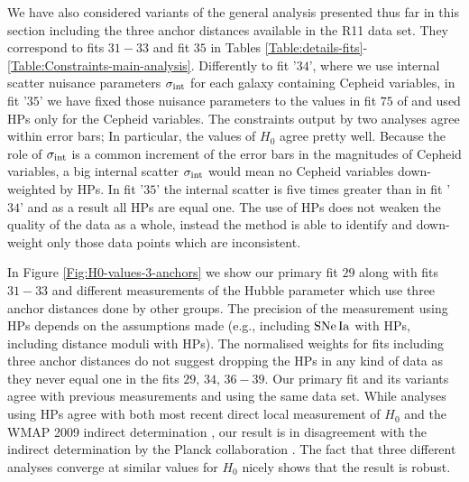 We have also considered variants of the general analysis presented thus far in this section including the three anchor distances available in the R11 data set. They correspond to fits $31-33$ and fit $35$ in Tables \ref{Table:details-fits}-\ref{Table:Constraints-main-analysis}. Differently to fit '$34$', where we use internal scatter nuisance parameters $\sigma_{\mathrm{int}}$ for each galaxy containing Cepheid variables, in fit '$35$'  we have fixed those nuisance parameters to the values in fit $75$ of \cite{Efstathiou:2013via} and used HPs only for the Cepheid variables. The constraints output by two analyses agree within error bars; In particular, the values of $H_0$ agree pretty well. Because the role of $\sigma_{\mathrm{int}}$ is a common increment of the error bars in the magnitudes of Cepheid variables, a big internal scatter $\sigma_{\mathrm{int}}$ would mean no Cepheid variables down-weighted by HPs. In fit '$35$' the internal scatter is five times greater than in fit '$34$' and as a result all HPs are equal one. The use of HPs does not weaken the quality of the data as a whole, instead the method is able to identify and down-weight only those data points which are inconsistent. 
 
In Figure \ref{Fig:H0-values-3-anchors} we show our primary fit $29$ along with fits $31-33$ and different measurements of the Hubble parameter which use three anchor distances done by other groups. The precision of the measurement using HPs depends on the assumptions made (e.g., including $\mathrm{SNe\,Ia}$ with HPs, including distance moduli with HPs). The normalised weights for fits including three anchor distances do not suggest dropping the HPs in any kind of data as they never equal one in the fits $29,\,34,\,36-39$. Our primary fit and its variants agree with previous measurements \cite{Riess:2011yx} and \cite{Efstathiou:2013via} using the same data set. While analyses using HPs agree with both most recent direct local measurement of $H_0$ \cite{Riess:2016jrr} and the WMAP 2009 indirect determination \cite{Hinshaw:2012aka}, our result is in disagreement with the indirect determination by the Planck collaboration \cite{Ade:2015xua}. The fact that three different analyses converge at similar values for $H_0$ nicely shows that the result is robust. 


